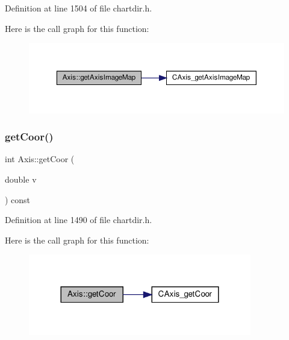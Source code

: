 Definition at line 1504 of file chartdir.\+h.

Here is the call graph for this function\+:
\nopagebreak
\begin{figure}[H]
\begin{center}
\leavevmode
\includegraphics[width=350pt]{class_axis_a27273baa6bef81839474b96f3560e003_cgraph}
\end{center}
\end{figure}
\mbox{\label{class_axis_a7a2277860d5f5d635a6d7156aeb1be33}} 
\subsubsection{\texorpdfstring{get\+Coor()}{getCoor()}}
{\footnotesize\ttfamily int Axis\+::get\+Coor (\begin{DoxyParamCaption}\item[{double}]{v }\end{DoxyParamCaption}) const\hspace{0.3cm}{\ttfamily [inline]}}



Definition at line 1490 of file chartdir.\+h.

Here is the call graph for this function\+:
\nopagebreak
\begin{figure}[H]
\begin{center}
\leavevmode
\includegraphics[width=276pt]{class_axis_a7a2277860d5f5d635a6d7156aeb1be33_cgraph}
\end{center}
\end{figure}
\mbox{\label{class_axis_a6a1b1952bcb2281243fe16470d814f9c}} 
